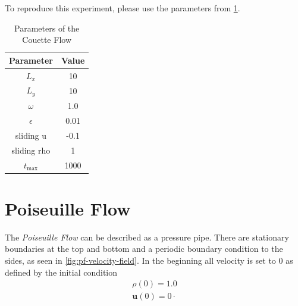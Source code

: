 To reproduce this experiment, please use the parameters from \cref{tab:cf-parameters}.

\begin{table}[H]
    \centering %
    \begin{tabular}{c c}
        \hline\hline %
        Parameter   & Value \\ [0.5ex] %
        \hline %
        $L_x$       & 10    \\
        $L_y$       & 10    \\
        $\omega$    & 1.0   \\
        $\epsilon$  & 0.01  \\
        sliding u   & -0.1  \\
        sliding rho & 1     \\
        $t_{\max}$  & 1000  \\ [1ex] %
        \hline %
    \end{tabular}
    \caption{Parameters of the Couette Flow} %
    \label{tab:cf-parameters}
\end{table}


\section{Poiseuille Flow}\label{sec:poiseuille-flow}
The \textit{Poiseuille Flow} can be described as a pressure pipe.
There are stationary boundaries at the top and bottom and a periodic boundary condition to the sides, as seen in \cref{fig:pf-velocity-field}.
In the beginning all velocity is set to 0 as defined by the initial condition
\begin{equation*}
    \begin{gathered}
        \rho(0) = 1.0 \\
        \mathbf{u}(0) = 0 \cdot
    \end{gathered}
\end{equation*}


